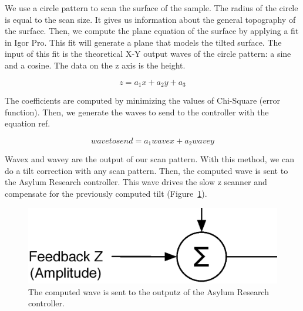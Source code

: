 We use a circle pattern to scan the surface of the sample. The radius of the circle is equal to the scan size. It gives us information about the general topography of the surface. Then, we compute the plane equation of the surface by applying a fit in Igor Pro. This fit will generate a plane that models the tilted surface. The input of this fit is the theoretical X-Y output waves of the circle pattern: a sine and a cosine. The data on the z axis is the height.

\begin{equation}\label{eqn:planeeq}
z = a_1 x + a_2 y + a_3 
\end{equation}

The coefficients are computed by minimizing the values of Chi-Square (error function). Then, we generate the waves to send to the controller with the equation ref.

\begin{equation}\label{eqn:sendwave}
wavetosend = a_1 wavex + a_2 wavey 
\end{equation}

Wavex and wavey are the output of our scan pattern. With this method, we can do a tilt correction with any scan pattern. Then, the computed wave is sent to the Asylum Research controller. This wave drives the slow z scanner and compensate for the previously computed tilt (Figure~\ref{outputz}).

\begin{figure}[H]
  \centering
  \includegraphics[scale=0.4]{images/outputz.eps}
    \caption{The computed wave is sent to the outputz of the Asylum Research controller.}
  \label{outputz}
\end{figure}